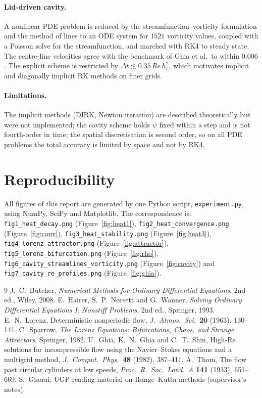 \documentclass[11pt,a4paper]{article}
\newcommand{\Dt}{\Delta t}
\begin{document}
\paragraph{Lid-driven cavity.} A nonlinear PDE problem is reduced by the streamfunction--vorticity
formulation and the method of lines to an ODE system for $1521$ vorticity values, coupled with a Poisson
solve for the streamfunction, and marched with RK4 to steady state. The centre-line velocities agree with
the benchmark of Ghia et al.\ to within $0.006$. The explicit scheme is restricted by
$\Dt\lesssim0.35\,Re\,h_s^2$, which motivates implicit and diagonally implicit RK methods on finer grids.

\paragraph{Limitations.} The implicit methods (DIRK, Newton iteration) are described theoretically but
were not implemented; the cavity scheme holds $\psi$ fixed within a step and is not fourth-order in time;
the spatial discretisation is second order, so on all PDE problems the total accuracy is limited by
space and not by RK4.

\section*{Reproducibility}
All figures of this report are generated by one Python script, \texttt{experiment.py}, using NumPy,
SciPy and Matplotlib. The correspondence is: \texttt{fig1\_heat\_decay.png} (Figure~\ref{fig:heat1}),
\texttt{fig2\_heat\_convergence.png} (Figure~\ref{fig:conv}), \texttt{fig3\_heat\_stability.png}
(Figure~\ref{fig:heat3}), \texttt{fig4\_lorenz\_attractor.png} (Figure~\ref{fig:attractor}),
\texttt{fig5\_lorenz\_bifurcation.png} (Figure~\ref{fig:rho}),
\texttt{fig6\_cavity\_streamlines\_vorticity.png} (Figure~\ref{fig:cavity}) and
\texttt{fig7\_cavity\_re\_profiles.png} (Figure~\ref{fig:ghia}).

\begin{thebibliography}{9}
 J.~C.~Butcher, \emph{Numerical Methods for Ordinary Differential Equations},
2nd ed., Wiley, 2008.
 E.~Hairer, S.~P.~N{\o}rsett and G.~Wanner, \emph{Solving Ordinary Differential
Equations I: Nonstiff Problems}, 2nd ed., Springer, 1993.
 E.~N.~Lorenz, Deterministic nonperiodic flow, \emph{J.\ Atmos.\ Sci.}\ \textbf{20}
(1963), 130--141.
 C.~Sparrow, \emph{The Lorenz Equations: Bifurcations, Chaos, and Strange
Attractors}, Springer, 1982.
 U.~Ghia, K.~N.~Ghia and C.~T.~Shin, High-Re solutions for incompressible flow using
the Navier--Stokes equations and a multigrid method, \emph{J.\ Comput.\ Phys.}\ \textbf{48} (1982),
387--411.
 A.~Thom, The flow past circular cylinders at low speeds, \emph{Proc.\ R.\ Soc.\
Lond.\ A} \textbf{141} (1933), 651--669.
 S.~Ghorai, UGP reading material on Runge--Kutta methods (supervisor's notes).
\end{thebibliography}
\end{document}
